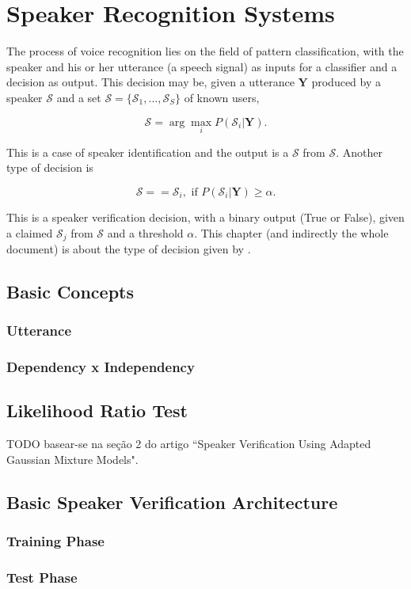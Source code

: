\chapter{Speaker Recognition Systems}

The process of voice recognition lies on the field of pattern classification, with the speaker and his or her utterance (a speech signal) as inputs for a classifier and a decision as output. This decision may be, given a utterance $\boldsymbol{Y}$ produced by a speaker $\mathcal{S}$ and a set $\boldsymbol{\mathcal{S}} = \{\mathcal{S}_1, ..., \mathcal{S}_S\}$ of known users,

\begin{equation}
    \mathcal{S} = \arg\max_i P(\mathcal{S}_i|\boldsymbol{Y}).
    \label{eq:decision_speaker_identification}
\end{equation}

\noindent This is a case of speaker identification and the output is a $\mathcal{S}$ from $\boldsymbol{\mathcal{S}}$. Another type of decision is

\begin{equation}
    \mathcal{S} == \mathcal{S}_i, \text{ if } P(\mathcal{S}_i|\boldsymbol{Y}) \geq \alpha.
    \label{eq:decision_speaker_verification}
\end{equation}

\noindent This is a speaker verification decision, with a binary output (True or False), given a claimed $\mathcal{S}_j$ from $\boldsymbol{\mathcal{S}}$ and a threshold $\alpha$. This chapter (and indirectly the whole document) is about the type of decision given by .

\section{Basic Concepts}

\subsection{Utterance}

\subsection{Dependency x Independency}

\section{Likelihood Ratio Test}

TODO basear-se na seção 2 do artigo ``Speaker Verification Using Adapted Gaussian Mixture Models".

\section{Basic Speaker Verification Architecture}

\subsection{Training Phase}

\subsection{Test Phase}